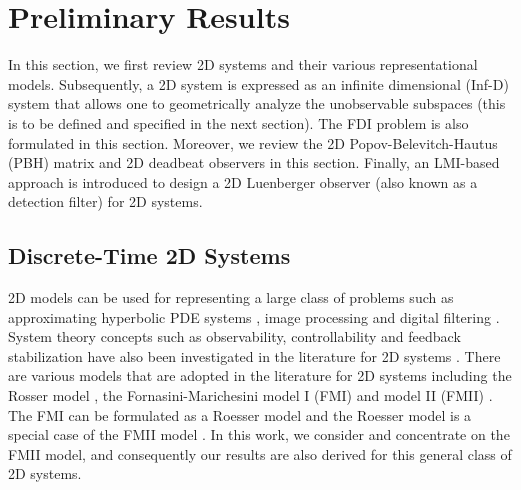 \documentclass[journal,12pt,draftcls,onecolumn]{IEEEtran}
\begin{document}
\section{Preliminary Results}\label{Sec:Backgground}
In this section, we first review 2D systems and their various representational models. Subsequently,  a 2D system is expressed as an infinite dimensional (Inf-D) system that allows one to geometrically analyze the unobservable subspaces (this is to be defined and specified in the next section). The FDI problem is also formulated in this section. Moreover, we review the 2D Popov-Belevitch-Hautus (PBH) matrix and 2D deadbeat observers in this section. Finally, an LMI-based approach is introduced to design a 2D Luenberger observer (also known as a detection filter) for 2D systems.
\subsection{Discrete-Time 2D Systems} \label{Sec:Dis_2D}    2D models can be used for representing a large class of problems such as approximating hyperbolic PDE systems \cite{ACC2013, HyperPDE_2D}, image processing  and digital filtering \cite{Roess}. System theory concepts such as observability, controllability and feedback stabilization have also been investigated in the literature  for 2D systems \cite{Kaczorek_Book, FMinBook, ACC2013, ntogramatzidis2012Siam, Valcher2013}.
There are various models that are adopted in the literature for 2D systems including the Rosser model \cite{Roess}, the Fornasini-Marichesini model I (FMI) and model II (FMII) \cite{FMinBook,Kaczorek_Book}. The FMI can be formulated as a Roesser model and the Roesser model is a special case of the FMII model \cite{Kaczorek_Book}. In this work, we consider and concentrate on the FMII model, and consequently our results are also derived for this general class of 2D systems. 
\end{document}
